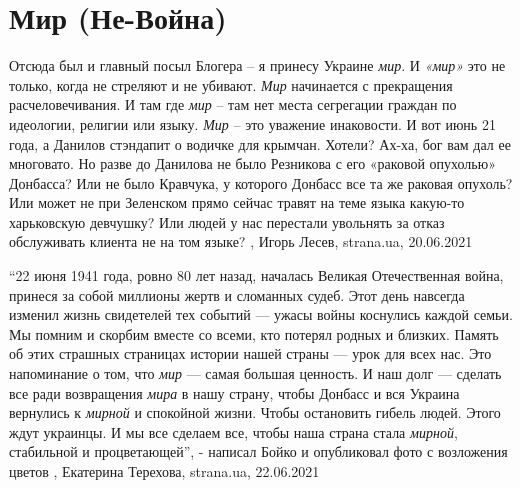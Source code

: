  
 
 
 
 
\chapter{Мир (Не-Война)}
\label{sec:slova.mir.peace}

Отсюда был и главный посыл Блогера – я принесу Украине \emph{мир}. И \emph{«мир»} это не
только, когда не стреляют и не убивают. \emph{Мир} начинается с прекращения
расчеловечивания. И там где \emph{мир} – там нет места сегрегации граждан по
идеологии, религии или языку. \emph{Мир} – это уважение инаковости.  И вот июнь 21
года, а Данилов стэндапит о водичке для крымчан. Хотели? Ах-ха, бог вам дал ее
многовато. Но разве до Данилова не было Резникова с его «раковой опухолью»
Донбасса? Или не было Кравчука, у которого Донбасс все та же раковая опухоль?
Или может не при Зеленском прямо сейчас травят на теме языка какую-то
харьковскую девчушку? Или людей у нас перестали увольнять за отказ обслуживать
клиента не на том языке?
, 
Игорь Лесев, strana.ua, 20.06.2021


\enquote{22 июня 1941 года, ровно 80 лет назад, началась Великая Отечественная война,
принеся за собой миллионы жертв и сломанных судеб.  Этот день навсегда изменил
жизнь свидетелей тех событий — ужасы войны коснулись каждой семьи. Мы помним и
скорбим вместе со всеми, кто потерял родных и близких.  Память об этих страшных
страницах истории нашей страны — урок для всех нас. Это напоминание о том, что
\emph{мир} — самая большая ценность. И наш долг — сделать все ради возвращения \emph{мира} в
нашу страну, чтобы Донбасс и вся Украина вернулись к \emph{мирной} и спокойной жизни.
Чтобы остановить гибель людей.  Этого ждут украинцы. И мы все сделаем все,
чтобы наша страна стала \emph{мирной}, стабильной и процветающей}, - написал Бойко и
опубликовал фото с возложения цветов 
, Екатерина Терехова, strana.ua, 22.06.2021
